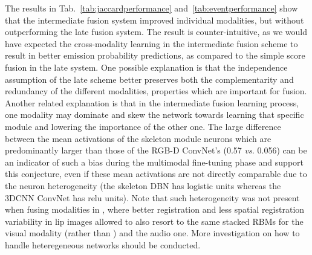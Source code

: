%
The results in Tab.~\ref{tab:jaccardperformance} and~\ref{tab:eventperformance} show that the intermediate fusion system
improved individual modalities, but without outperforming the late fusion system.
%
The result is counter-intuitive, as we would have expected the cross-modality learning in the intermediate fusion scheme
to result in better emission probability predictions, as compared to the simple score fusion in the late system.
%
One possible explanation is that the independence assumption of the late scheme better preserves both
the complementarity and redundancy of the different modalities, properties which are important for fusion.
%
Another related explanation is that in the intermediate fusion learning process,
one modality may dominate and  skew the network towards  learning that specific module and
lowering the importance of the other one.
%
The large difference between the mean activations of the  skeleton module neurons which are predominantly larger than those of the
RGB-D ConvNet's (0.57 \emph{vs.} 0.056) can be an indicator of such a bias during the multimodal fine-tuning phase and
support this conjecture, even if these mean activations are not directly comparable
due to the neuron heterogeneity (the skeleton DBN has logistic units whereas the 3DCNN ConvNet has relu units).
%
Note that such heterogeneity was not present when fusing modalities  in \cite{Ngiam2011multimodal},
where better registration and less spatial registration variability in lip images
allowed to also resort to the same stacked RBMs for the visual modality (rather than \ThreeDCNN)  and the audio one.
%
More investigation on how to handle heteregeneous networks  should be conducted.



%

